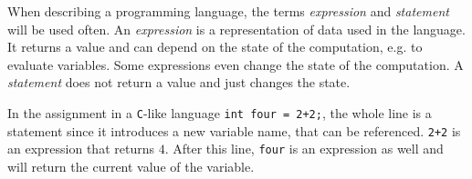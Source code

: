 When describing a programming language, the terms \emph{expression} and {\em
statement} will be used often. An \emph{expression} is a representation of 
data used in the language. It returns a value and can depend on the state of 
the computation, e.g. to evaluate variables. Some expressions even change the 
state of the computation. A \emph{statement} does not return a value and just 
changes the state.
\begin{example}
	In the assignment in a {\tt C}-like language {\tt int four = 2+2;}, the 
	whole line is a statement since it introduces a new variable name, that 
	can be referenced. {\tt 2+2} is an expression that returns $4$. After this 
	line, {\tt four} is an expression as well and will return the current value 
	of the variable.
\end{example}


